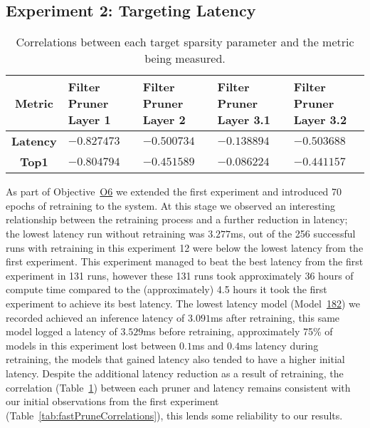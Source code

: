 \documentclass[../Dissertation.tex]{subfiles}
\begin{document}
\subsection{Experiment 2: Targeting Latency}\label{sec:Experiment2}

\singlespacing
\begin{table}[H]
    \centering
    \begin{tabular}{@{}cp{26mm}p{26mm}p{26mm}p{26mm}@{}}
    \toprule
    \textbf{Metric}  & \textbf{Filter Pruner  Layer 1} & \textbf{Filter Pruner Layer 2} & \textbf{Filter Pruner Layer 3.1} & \textbf{Filter Pruner Layer 3.2} \\ \midrule
    \textbf{Latency} & $-0.827473$                        & $-0.500734$                      & $-0.138894$                         & $-0.503688$                         \\
    \textbf{Top1}    & $-0.804794$                        & $-0.451589$                      & $-0.086224$                        & $-0.441157$                        \\ \bottomrule
    \end{tabular}
    \caption{Correlations between each target sparsity parameter and the metric being measured.}
    \label{tab:Ex2PruneCorrelations}
\end{table}
\doublespacing

As part of Objective~\hyperref[obj:AutoParams]{O6} we extended the first experiment and introduced 70 epochs of retraining to the system. 
At this stage we observed an interesting relationship between the retraining process and a further reduction in latency; the lowest latency run without retraining was $3.277$ms, out of the 256 successful runs with retraining in this experiment 12 were below the lowest latency from the first experiment.
This experiment managed to beat the best latency from the first experiment in 131 runs, however these 131 runs took approximately 36 hours of compute time compared to the (approximately) 4.5 hours it took the first experiment to achieve its best latency.
The lowest latency model (Model~\hyperref[sec:sec:unique-sweep-182]{182}) we recorded achieved an inference latency of $3.091$ms after retraining, this same model logged a latency of $3.529$ms before retraining, approximately 75\% of models in this experiment lost between $0.1$ms and $0.4$ms latency during retraining, the models that gained latency also tended to have a higher initial latency.
Despite the additional latency reduction as a result of retraining, the correlation (Table~\ref{tab:Ex2PruneCorrelations}) between each pruner and latency remains consistent with our initial observations from the first experiment (Table~\ref{tab:fastPruneCorrelations}), this lends some reliability to our results.
\end{document}

